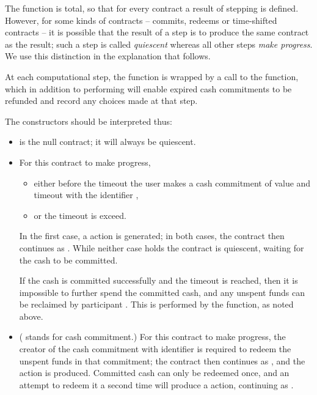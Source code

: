 \documentclass[
      acmsmall
    , screen
    , review=true
  ]{acmart}
\begin{document}
The  function is total, so that for every contract a result of stepping is defined. However, for some kinds of contracts -- commits, redeems or time-shifted contracts -- it is possible that the result of a step is to produce the same contract as the result; such a step is called \emph{quiescent} whereas all other steps \emph{make progress}. We use this distinction in the explanation that follows.


At each computational step, the  function is wrapped by a call to the  function, which in addition to performing  will enable expired cash commitments to be refunded and record any choices made at that step.


The constructors should be interpreted thus:

\begin{itemize} 

\item {} is the null contract; it will always be quiescent.

\item {}  For this contract to make progress,\begin{itemize}
\item either before the timeout  the user  makes a cash commitment of value  and timeout   with the identifier  , 
\item
or the timeout  is exceed.
\end{itemize} 
In the first case, a  action is generated; in both cases, the contract then continues as . While neither case holds the contract is quiescent, waiting for the cash to be committed. 

If the cash is committed successfully and the timeout  is reached, then it is impossible to further spend the committed cash, and any unspent funds can be reclaimed by participant .
 This is performed by the  function, as noted above.

\item {} ( stands for cash commitment.) For this contract to make progress, the creator of the cash commitment with identifier  is required to redeem the unspent funds in that commitment; the contract then continues as , and the action  is produced. 
Committed cash can only be redeemed once, and an attempt to redeem it a second time will produce a   action, continuing as .


\end{itemize}
\end{document}
